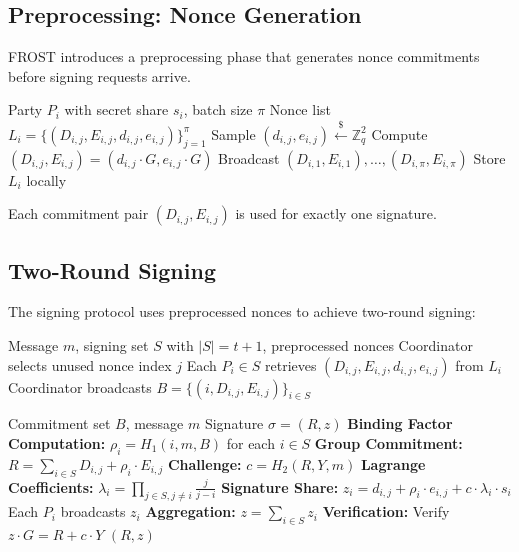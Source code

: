 \documentclass[11pt,a4paper]{article}
\begin{document}
\subsection{Preprocessing: Nonce Generation}

FROST introduces a preprocessing phase that generates nonce commitments before signing requests arrive.

\begin{algorithm}
\caption{FROST-Preprocess}
\begin{algorithmic}[1]
\Require Party $P_i$ with secret share $s_i$, batch size $\pi$
\Ensure Nonce list $L_i = \{(D_{i,j}, E_{i,j}, d_{i,j}, e_{i,j})\}_{j=1}^{\pi}$
    \State Sample $(d_{i,j}, e_{i,j}) \xleftarrow{\$} \mathbb{Z}_q^2$
    \State Compute $(D_{i,j}, E_{i,j}) = (d_{i,j} \cdot G, e_{i,j} \cdot G)$
\EndFor
\State Broadcast $(D_{i,1}, E_{i,1}), \ldots, (D_{i,\pi}, E_{i,\pi})$
\State Store $L_i$ locally
\end{algorithmic}
\end{algorithm}

Each commitment pair $(D_{i,j}, E_{i,j})$ is used for exactly one signature.

\subsection{Two-Round Signing}

The signing protocol uses preprocessed nonces to achieve two-round signing:

\begin{algorithm}
\caption{FROST-Sign (Round 1: Commitment)}
\begin{algorithmic}[1]
\Require Message $m$, signing set $S$ with $|S| = t+1$, preprocessed nonces
\State Coordinator selects unused nonce index $j$
\State Each $P_i \in S$ retrieves $(D_{i,j}, E_{i,j}, d_{i,j}, e_{i,j})$ from $L_i$
\State Coordinator broadcasts $B = \{(i, D_{i,j}, E_{i,j})\}_{i \in S}$
\end{algorithmic}
\end{algorithm}

\begin{algorithm}
\caption{FROST-Sign (Round 2: Response)}
\begin{algorithmic}[1]
\Require Commitment set $B$, message $m$
\Ensure Signature $\sigma = (R, z)$
\State \textbf{Binding Factor Computation:}
\State $\rho_i = H_1(i, m, B)$ for each $i \in S$
\State \textbf{Group Commitment:}
\State $R = \sum_{i \in S} D_{i,j} + \rho_i \cdot E_{i,j}$
\State \textbf{Challenge:}
\State $c = H_2(R, Y, m)$
\State \textbf{Lagrange Coefficients:}
\State $\lambda_i = \prod_{j \in S, j \neq i} \frac{j}{j-i}$
\State \textbf{Signature Share:}
\State $z_i = d_{i,j} + \rho_i \cdot e_{i,j} + c \cdot \lambda_i \cdot s_i$
\State Each $P_i$ broadcasts $z_i$
\State \textbf{Aggregation:}
\State $z = \sum_{i \in S} z_i$
\State \textbf{Verification:}
\State Verify $z \cdot G = R + c \cdot Y$
\State \Return $(R, z)$
\end{algorithmic}
\end{algorithm}
\end{document}
